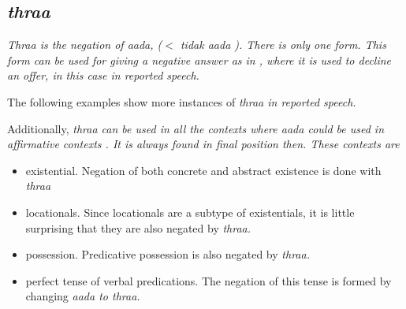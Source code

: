 \subsection{\em thraa\em}\label{sec:wc:thraa}
\em Thraa \em is the negation of \em aada\em, ($<$ \em tidak aada \em \citep[cf.][26]{Adelaar1991}). There is only one form. This form can be used for giving a negative answer as in  , where it is used to decline an offer, in this case in reported speech.



The following examples show more instances of \em thraa \em in reported speech.




Additionally, \em thraa \em can be used in all the contexts where \em aada \em could be used in affirmative contexts . It is always found in final position then. These contexts are
\begin{itemize}
	\item existential. Negation of both concrete and abstract existence is done with \em thraa\em
	\item locationals. Since locationals are a subtype of existentials, it is little surprising that they are also negated by \em thraa\em.
	\item possession. Predicative possession is also negated by \em thraa\em.
	\item perfect tense of verbal predications. The negation of this tense is formed by changing \em aada \em to \em thraa\em.
\end{itemize}

